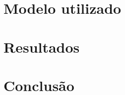 \documentclass[conference,compsoc]{IEEEtran}
\begin{document}
\section{Modelo utilizado}
\section{Resultados}
\section{Conclus\~ao}








\ifCLASSOPTIONcompsoc









%
%
%
{}


%
%
%
%
%




\end{document}

